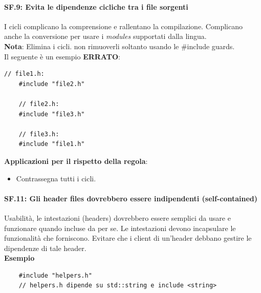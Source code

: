 \paragraph{SF.9: Evita le dipendenze cicliche tra i file sorgenti}

\textsf{\small I cicli complicano la comprensione e rallentano la compilazione. Complicano anche la conversione per usare i \emph{modules} supportati dalla lingua.} \\

\textsf{\small \textbf{Nota}: Elimina i cicli. non rimuoverli soltanto usando le \#include guards.} \\

\textsf{\small Il seguente è un esempio \textbf{\color{red}ERRATO}\normalcolor:}

\begin{lstlisting}[frame=single, rulecolor=\color{red}]
	// file1.h:
	#include "file2.h"
	
	// file2.h:
	#include "file3.h"
	
	// file3.h:
	#include "file1.h"
\end{lstlisting}

\textsf{\small \textbf{Applicazioni per il rispetto della regola}: }

\begin{itemize}
	\item \textsf{\small Contrassegna tutti i cicli.}
\end{itemize}

\paragraph{SF.11: Gli header files dovrebbero essere indipendenti (self-contained)}

\textsf{\small Usabilità, le intestazioni (headers) dovrebbero essere semplici da usare e funzionare quando incluse da per se. Le intestazioni devono incapsulare le funzionalità che forniscono. Evitare che i client di un'header debbano gestire le dipendenze di tale header.} \\

\textsf{\small \textbf{Esempio}}

\begin{lstlisting}
	#include "helpers.h"
	// helpers.h dipende su std::string e include <string>
\end{lstlisting}

